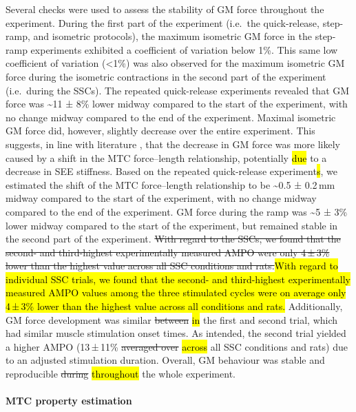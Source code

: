 \documentclass[
  10pt,
  letterpaper,
]{article}
\begin{document}
Several checks were used to assess the stability of GM force throughout
the experiment. During the first part of the experiment (i.e.~the
quick-release, step-ramp, and isometric protocols), the maximum
isometric GM force in the step-ramp experiments exhibited a coefficient
of variation below 1\%. This same low coefficient of variation
(\textless1\%) was also observed for the maximum isometric GM force
during the isometric contractions in the second part of the experiment
(i.e.~during the SSCs). The repeated quick-release experiments revealed
that GM force was \textasciitilde11 ± 8\% lower midway compared to the
start of the experiment, with no change midway compared to the end of
the experiment. Maximal isometric GM force did, however, slightly
decrease over the entire experiment. This suggests, in line with
literature \citep[e.g.][]{aubert_tension-length_1951}, that the decrease
in GM force was more likely caused by a shift in the MTC force--length
relationship, potentially \hl{due} to a decrease in SEE stiffness. Based
on the repeated quick-release experiment\hl{s}, we estimated the shift
of the MTC force--length relationship to be \textasciitilde0.5 ± 0.2\,mm
midway compared to the start of the experiment, with no change midway
compared to the end of the experiment. GM force during the ramp was
\textasciitilde5 ± 3\% lower midway compared to the start of the
experiment, but remained stable in the second part of the experiment.
\st{With regard to the SSCs, we found that the second- and third-highest
experimentally measured AMPO were only 4\,±\,3\% lower than the highest
value across all SSC conditions and rats.}\hl{With regard to individual
SSC trials, we found that the second- and third-highest experimentally
measured AMPO values among the three stimulated cycles were on average
only 4\,±\,3\% lower than the highest value across all conditions and
rats.} Additionally, GM force development was similar \st{between}
\hl{in} the first and second trial, which had similar muscle stimulation
onset times. As intended, the second trial yielded a higher AMPO
(13\,±\,11\% \st{averaged over} \hl{across} all SSC conditions and rats)
due to an adjusted stimulation duration. Overall, GM behaviour was
stable and reproducible \st{during} \hl{throughout} the whole
experiment.

\paragraph{MTC property estimation}\label{mtc-property-estimation}
\end{document}

